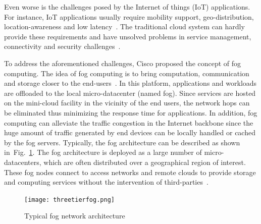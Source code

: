 \documentclass[10pt,journal,compsoc]{IEEEtran}
\newcommand{\Fig}[1]{Fig.~\ref{#1}}
\begin{document}
Even worse is the challenges posed by the Internet of things (IoT) applications. For instance, IoT applications usually require mobility support, geo-distribution, location-awareness and low latency~\cite{bonomi2014fog}. The traditional cloud system can hardly provide these requirements and have unsolved problems in service management, connectivity and security challenges~\cite{yi2015survey}. 

To address the aforementioned challenges, Cisco proposed the concept of fog computing. The idea of fog computing is to bring computation, communication and storage closer to the end-users~\cite{yi2015survey}. In this platform, applications and workloads are offloaded to the local micro-datacenter (named fog). Since services are hosted on the mini-cloud facility in the vicinity of the end users, the network hops can be eliminated thus minimizing the response time for applications. In addition, fog computing can alleviate the traffic congestion in the Internet backbone since the huge amount of traffic generated by end devices can be locally handled or cached by the fog servers. Typically, the fog architecture can be described as shown in~\Fig{foggg}. The fog architecture is deployed as a large number of micro-datacenters, which are often distributed over a geographical region of interest. These fog nodes connect to access networks and remote clouds to provide storage and computing services without the intervention of third-parties~\cite{chiang2016fog}.

\begin{figure}[ht]
\centerline{\texttt{[image: threetierfog.png]}}
\caption{Typical fog network architecture \cite{aazam2016fog}} 
\label{foggg}
\end{figure}
 
\end{document}
